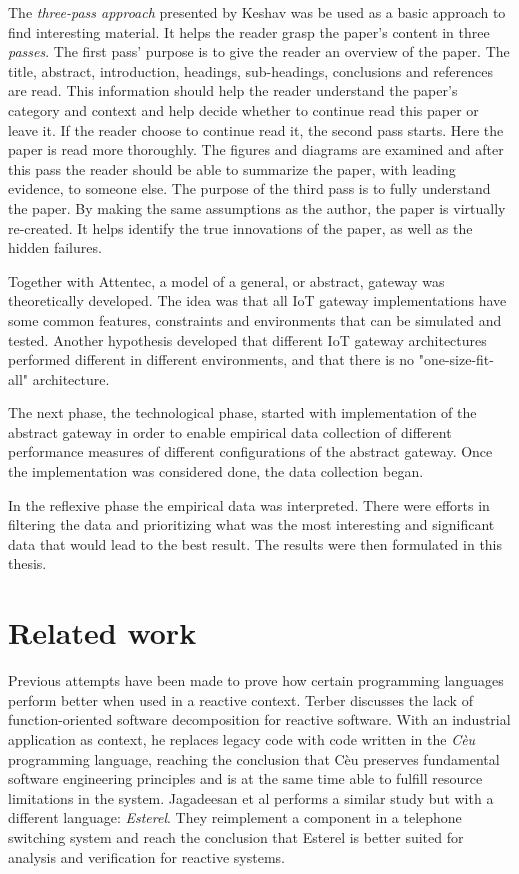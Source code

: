The \textit{three-pass approach} presented by Keshav \cite{keshav2007read} was
be used as a basic approach to find interesting material. It helps the reader
grasp the paper's content in three \textit{passes}. The first pass' purpose is
to give the reader an overview of the paper. The title, abstract, introduction,
headings, sub-headings, conclusions and references are read. This information
should help the reader understand the paper's category and context and help
decide whether to continue read this paper or leave it. If the reader choose to
continue read it, the second pass starts. Here the paper is read more
thoroughly. The figures and diagrams are examined and after this pass the
reader should be able to summarize the paper, with leading evidence, to someone
else. The purpose of the third pass is to fully understand the paper. By making
the same assumptions as the author, the paper is virtually re-created. It helps
identify the true innovations of the paper, as well as the hidden failures.

Together with Attentec, a model of a general, or abstract, gateway was
theoretically developed. The idea was that all IoT gateway implementations have
some common features, constraints and environments that can be simulated and
tested. Another hypothesis developed that different IoT gateway architectures
performed different in different environments, and that there is no
"one-size-fit-all" architecture.

The next phase, the technological phase, started with implementation of the
abstract gateway in order to enable empirical data collection of different
performance measures of different configurations of the abstract gateway. Once
the implementation was considered done, the data collection began.

In the reflexive phase the empirical data was interpreted. There were efforts
in filtering the data and prioritizing what was the most interesting and
significant data that would lead to the best result. The results were then
formulated in this thesis.

\section{Related work}

Previous attempts have been made to prove how certain programming languages
perform better when used in a reactive context. Terber
\cite{terber2017function} discusses the lack of function-oriented software
decomposition for reactive software. With an industrial application as context,
he replaces legacy code with code written in the \textit{Cèu} programming
language, reaching the conclusion that Cèu preserves fundamental software
engineering principles and is at the same time able to fulfill resource
limitations in the system. Jagadeesan et al \cite{jagadeesan1996formal}
performs a similar study but with a different language: \textit{Esterel}. They
reimplement a component in a telephone switching system and reach the
conclusion that Esterel is better suited for analysis and verification for
reactive systems.

